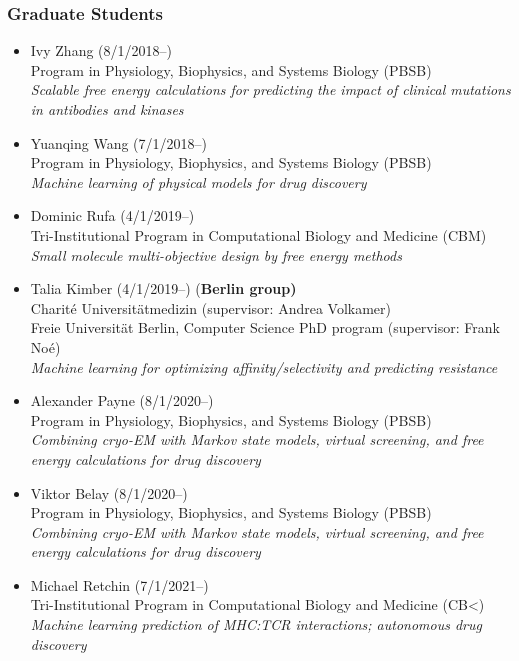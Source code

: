 \documentclass[10pt]{article}
\begin{document}
\subsubsection*{Graduate Students}

\begin{itemize}
  \item Ivy Zhang (8/1/2018--)\\
  Program in Physiology, Biophysics, and Systems Biology (PBSB)\\
  \emph{Scalable free energy calculations for predicting the impact of clinical mutations in antibodies and kinases}
  
  \item Yuanqing Wang (7/1/2018--)\\
  Program in Physiology, Biophysics, and Systems Biology (PBSB)\\
  \emph{Machine learning of physical models for drug discovery}
  
  \item Dominic Rufa (4/1/2019--)\\
  Tri-Institutional Program in Computational Biology and Medicine (CBM)\\
  \emph{Small molecule multi-objective design by free energy methods}

  \item Talia Kimber (4/1/2019--) {(\bf Berlin group)}\\
  Charit\'e Universit\"{a}tmedizin (supervisor: Andrea Volkamer)\\
  Freie Universit\"{a}t Berlin, Computer Science PhD program (supervisor: Frank No\'{e})\\
  \emph{Machine learning for optimizing affinity/selectivity and predicting resistance}
  
  \item Alexander Payne (8/1/2020--)\\
  Program in Physiology, Biophysics, and Systems Biology (PBSB)\\
  \emph{Combining cryo-EM with Markov state models, virtual screening, and free energy calculations for drug discovery}
  
  \item Viktor Belay (8/1/2020--)\\
  Program in Physiology, Biophysics, and Systems Biology (PBSB)\\
  \emph{Combining cryo-EM with Markov state models, virtual screening, and free energy calculations for drug discovery}

  \item Michael Retchin (7/1/2021--)\\
  Tri-Institutional Program in Computational Biology and Medicine (CB<)\\
  \emph{Machine learning prediction of MHC:TCR interactions; autonomous drug discovery}

\end{itemize}
\end{document}
